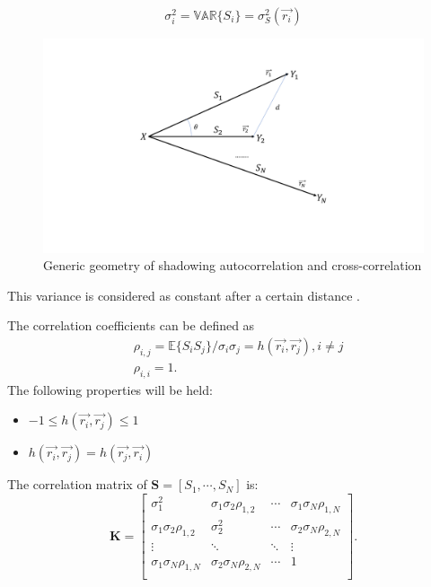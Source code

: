 \begin{equation}
\sigma_{i}^{2} = \mathbb{VAR}\{S_{i}\} = \sigma_{S}^2(\vec{r_{i}})
\label{sigma}
\end{equation}
\begin{figure} 
\centering
\includegraphics[width=14cm]{FadingGeometry.pdf}
\caption{Generic geometry of shadowing autocorrelation and cross-correlation}
\label{geometry}
\end{figure}
This variance is considered as constant after a certain distance \cite{kitchener2006correlated}.
\par The correlation coefficients can be defined as
\begin{equation}
\begin{split}
& \rho_{i,j} = \mathbb{E}\{S_{i}S_{j}\}/\sigma_{i}\sigma_{j} = h(\vec{r_{i}}, \vec{r_{j}}), i \neq j \\
& \rho_{i,i} = 1.
\end{split}
\end{equation}
The following properties will be held:
\begin{itemize} 
\item $-1\leq h(\vec{r_{i}}, \vec{r_{j}}) \leq 1$
\item $h(\vec{r_{i}}, \vec{r_{j}})  = h(\vec{r_{j}}, \vec{r_{i}}) $
\end{itemize}
The correlation matrix of $\mathbf{S} = [S_{1}, \cdots, S_{N}]$ is:
\begin{equation}
\mathbf{K} = \left[\begin{array}{cccc}
\sigma_{1}^{2} & \sigma_{1}\sigma_{2}\rho_{1,2} & \cdots & \sigma_{1}\sigma_{N}\rho_{1,N}\\
\sigma_{1}\sigma_{2}\rho_{1,2} & \sigma_{2}^{2} & \cdots & \sigma_{2}\sigma_{N}\rho_{2,N}\\
\vdots & \ddots & \ddots & \vdots\\
\sigma_{1}\sigma_{N}\rho_{1,N} & \sigma_{2}\sigma_{N}\rho_{2,N} & \cdots & 1\\
\end{array}\right].
\end{equation}
